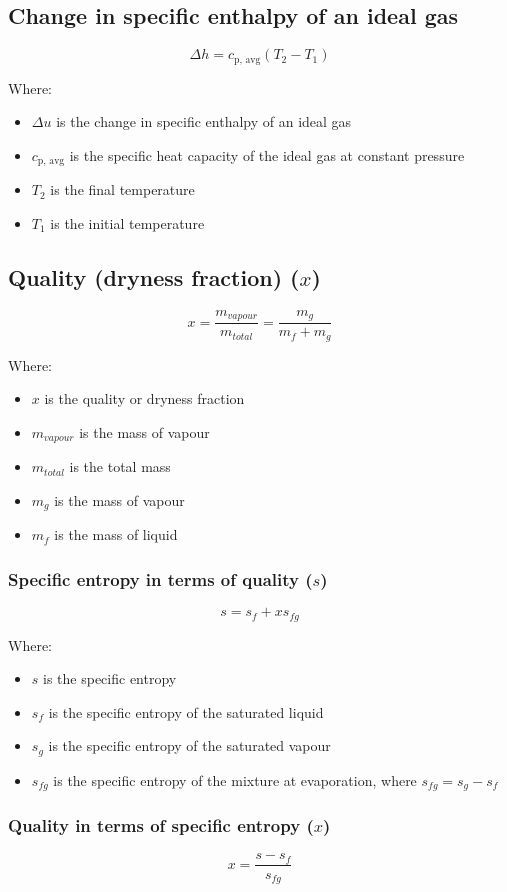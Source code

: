 \documentclass[11pt]{article}
\begin{document}
\subsection{Change in specific enthalpy of an ideal gas}
\label{sec:org881b4fd}
\[\Delta h = c_{\text{p, avg}} (T_2 - T_1)\]

Where:
\begin{itemize}
\item \(\Delta u\) is the change in specific enthalpy of an ideal gas
\item \(c_{\text{p, avg}}\) is the specific heat capacity of the ideal gas at constant pressure
\item \(T_2\) is the final temperature
\item \(T_1\) is the initial temperature
\end{itemize}
\subsection{Quality (dryness fraction) (\(x\))}
\label{sec:orge36c886}
\[x = \frac{m_{vapour}}{m_{total}} = \frac{m_g}{m_f + m_g}\]

Where:
\begin{itemize}
\item \(x\) is the quality or dryness fraction
\item \(m_{vapour}\) is the mass of vapour
\item \(m_{total}\) is the total mass
\item \(m_g\) is the mass of vapour
\item \(m_f\) is the mass of liquid
\end{itemize}
\subsubsection{Specific entropy in terms of quality (\(s\))}
\label{sec:orgf4b4b51}
\[s = s_f + xs_{fg}\]

Where:
\begin{itemize}
\item \(s\) is the specific entropy
\item \(s_f\) is the specific entropy of the saturated liquid
\item \(s_g\) is the specific entropy of the saturated vapour
\item \(s_{fg}\) is the specific entropy of the mixture at evaporation, where \(s_{fg} = s_g - s_f\)
\end{itemize}
\subsubsection{Quality in terms of specific entropy (\(x\))}
\label{sec:orgaff2904}
\[x = \frac{s - s_f}{s_{fg}}\]
\end{document}
